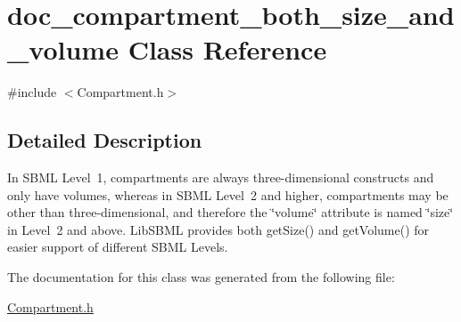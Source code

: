 \hypertarget{classdoc__compartment__both__size__and__volume}{}\section{doc\+\_\+compartment\+\_\+both\+\_\+size\+\_\+and\+\_\+volume Class Reference}
\label{classdoc__compartment__both__size__and__volume}


{\ttfamily \#include $<$Compartment.\+h$>$}



\subsection{Detailed Description}
\begin{DoxyParagraph}{}
In S\+B\+ML Level~1, compartments are always three-\/dimensional constructs and only have volumes, whereas in S\+B\+ML Level~2 and higher, compartments may be other than three-\/dimensional, and therefore the \char`\"{}volume\char`\"{} attribute is named \char`\"{}size\char`\"{} in Level~2 and above. Lib\+S\+B\+ML provides both get\+Size() and get\+Volume() for easier support of different S\+B\+ML Levels. 
\end{DoxyParagraph}


The documentation for this class was generated from the following file\+:\begin{DoxyCompactItemize}
\item 
\hyperlink{_compartment_8h}{Compartment.\+h}\end{DoxyCompactItemize}
